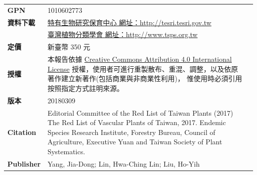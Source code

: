 \begin{table}[H]
{\begin{tabular}{>{\raggedleft\arraybackslash}p{2.5cm}p{9cm}p{3cm}}
      \textbf{GPN}               & 1010602773  & \\
      \textbf{資料下載}          & \href{http://tesri.tesri.gov.tw}{特有生物研究保育中心 網址：http://tesri.tesri.gov.tw}  & \\
                                 & \href{http://www.tsps.org.tw}{臺灣植物分類學會 網址：http://www.tsps.org.tw}  & \\
      \textbf{定價}              & 新臺幣 350 元  & \\
      \textbf{授權}              & 本報告依據
                                   \href{https://creativecommons.org/licenses/by/4.0}{Creative Commons Attribution 4.0 International License}
                                   授權，使用者可進行重製散布、重混、調整，以及依原著作建立新著作(包括商業與非商業性利用)，
                                   惟使用時必須引用按照指定方式註明來源。  & \\
      \textbf{版本}              & 20180309 \\
      \textbf{Citation}          & Editorial Committee of the Red List of Taiwan Plants (2017) The Red List of Vascular Plants of Taiwan, 2017.
                                   Endemic Species Research Institute, Forestry Bureau, Council of Agriculture, 
                                   Executive Yuan and Taiwan Society of Plant Systematics.  & \\
      \textbf{Publisher}         & Yang, Jia-Dong; Lin, Hwa-Ching Lin; Liu, Ho-Yih  & 
\end{tabular}}
\end{table}
